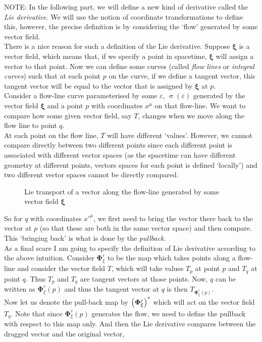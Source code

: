 NOTE: In the following part, we will define a new kind of derivative called the \textit{Lie derivative}. We will use the notion of coordinate transformations to define this, however, the precise definition is by considering the `flow' generated by some vector field.\\[0.2cm]
There is a nice reason for such a definition of the Lie derivative. Suppose $\boldsymbol{\xi}$ is a vector field, which means that, if we specify a point in spacetime, $\boldsymbol{\xi}$ will assign a vector to that point. Now we can define some curves (called \textit{flow lines} or \textit{integral curves}) such that at each point $p$ on the curve, if we define a tangent vector, this tangent vector will be equal to the vector that is assigned by $\boldsymbol{\xi}$ at $p$. \\[0.2cm] 
Consider a flow-line curve parameterised by some $\varepsilon$, $\upsigma(\varepsilon)$ generated by the vector field $\boldsymbol{\xi}$ and a point $p$ with coordinates $x^\mu$ on that flow-line. We want to compare how some given vector field, say $T$, changes when we move along the flow line to point $q$.\\[0.2cm] At each point on the flow line, $T$ will have different `values'. However, we cannot compare directly between two different points since each different point is associated with different vector spaces (as the spacetime can have different geometry at different points, vectors spaces for each point is defined `locally') and two different vector spaces cannot be directly compared.
\begin{figure}[H]
    \centering 
    
    \caption{Lie transport of a vector along the flow-line generated by some vector field $\boldsymbol{\xi}$}
\end{figure}
\noindent
So for $q$ with coordinates $x'^\mu$, we first need to bring the vector there back to the vector at $p$ (so that these are both in the same vector space) and then compare. This `bringing back' is what is done by the \textit{pullback}.\\[0.2cm] As a final scare I am going to specify the definition of Lie derivative according to the above intuition. Consider $\boldsymbol{\Phi}^\varepsilon_\xi$ to be the map which takes points along a flow-line and consider the vector field $T$, which will take values $T_p$ at point $p$ and $T_q$ at point $q$. Thus $T_p$ and $T_q$ are tangent vectors at those points. Now, $q$ can be written as $\boldsymbol{\Phi}^\varepsilon_\xi(p)$ and thus the tangent vector at $q$ is then $T_{\boldsymbol{\Phi}^\varepsilon_\xi(p)}$.\\[0.2cm] Now let us denote the pull-back map by $\qty(\boldsymbol{\Phi}^\varepsilon_\xi)^*$ which will act on the vector field $T_q$. Note that since $\boldsymbol{\Phi}^\varepsilon_\xi(p)$ generates the flow, we need to define the pullback with respect to this map only. And then the Lie derivative compares between the dragged vector and the original vector,
